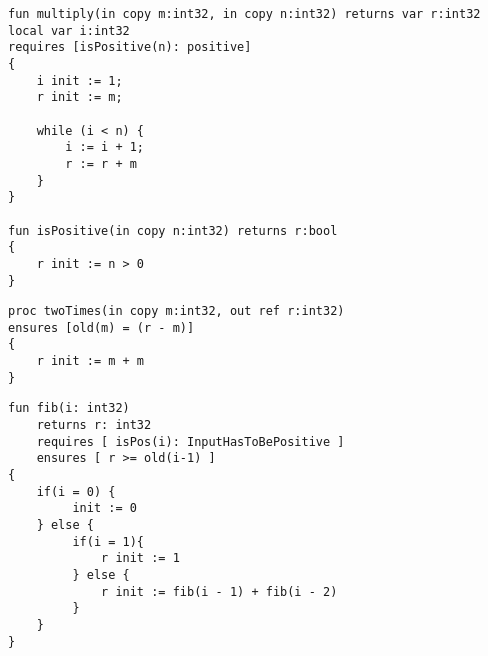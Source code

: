 \begin{lstlisting}[caption=Pre-/postconditions mit Funktion in der Condition List und Label]
fun multiply(in copy m:int32, in copy n:int32) returns var r:int32
local var i:int32
requires [isPositive(n): positive]
{
    i init := 1;
    r init := m;

    while (i < n) {
        i := i + 1;
        r := r + m
    }
}

fun isPositive(in copy n:int32) returns r:bool
{
    r init := n > 0
}
\end{lstlisting}

\begin{lstlisting}[caption=Pre-/postconditions mit old Funktion und Zugriff auf out Parameter]
proc twoTimes(in copy m:int32, out ref r:int32)
ensures [old(m) = (r - m)]
{
    r init := m + m
}
\end{lstlisting}

\begin{lstlisting}[caption=Pre-/postconditions mit old Funktion und Zugriff auf Return Wert]
fun fib(i: int32)
    returns r: int32
    requires [ isPos(i): InputHasToBePositive ]
    ensures [ r >= old(i-1) ]
{
    if(i = 0) {
         init := 0
    } else {
         if(i = 1){
             r init := 1
         } else {
             r init := fib(i - 1) + fib(i - 2)
         }
    }
}
\end{lstlisting}
